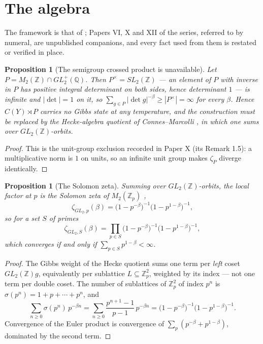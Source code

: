 \documentclass[11pt]{amsart}
\numberwithin{equation}{section}
\newtheorem{proposition}[theorem]{Proposition}
\theoremstyle{definition}
\theoremstyle{remark}
\newcommand{\Z}{\mathbb{Z}}
\newcommand{\Q}{\mathbb{Q}}
\begin{document}
\maketitle

\section{The algebra}

The framework is that of \cite{Main}; Papers VI, X and XII of the series, referred to by
numeral, are unpublished companions, and every fact used from them is restated or verified
in place.

\begin{proposition}[The semigroup crossed product is unavailable]\label{prop:units}
Let $P=M_2(\Z)\cap GL_2^+(\Q)$. Then $P^\times=SL_2(\Z)$ --- an element of $P$ with inverse
in $P$ has positive integral determinant on both sides, hence determinant $1$ --- is
infinite and $|\det|=1$ on it, so
$\sum_{g\in P}|\det g|^{-\beta}\ge|P^\times|=\infty$ for every $\beta$. Hence
$C(Y)\rtimes P$ carries no Gibbs state at any temperature, and the construction must be
replaced by the Hecke-algebra quotient of Connes--Marcolli \cite{CM}, in which one sums over
$GL_2(\Z)$-orbits.
\end{proposition}

\begin{proof}
This is the unit-group exclusion recorded in Paper X (its Remark 1.5): a multiplicative norm
is $1$ on units, so an infinite unit group makes
$\zeta_P$ diverge identically.
\end{proof}

\begin{proposition}[The Solomon zeta]\label{prop:solomon}
Summing over $GL_2(\Z)$-orbits, the local factor at $p$ is the Solomon zeta of $M_2(\Z_p)$
\cite{Solomon},
\[
\zeta_{GL_2,p}(\beta)=\bigl(1-p^{-\beta}\bigr)^{-1}\bigl(1-p^{1-\beta}\bigr)^{-1},
\]
so for a set $S$ of primes
\begin{equation}\label{eq:zetaGL2}
\zeta_{GL_2,S}(\beta)=\prod_{p\in S}\bigl(1-p^{-\beta}\bigr)^{-1}\bigl(1-p^{1-\beta}\bigr)^{-1},
\end{equation}
which converges if and only if $\sum_{p\in S}p^{1-\beta}<\infty$.
\end{proposition}

\begin{proof}
The Gibbs weight of the Hecke quotient sums one term per \emph{left} coset $GL_2(\Z)g$,
equivalently per sublattice $L\subseteq\Z_p^2$, weighted by its index \cite{CM} --- not one
term per double coset. The number of sublattices of $\Z_p^2$ of index $p^n$ is
$\sigma(p^n)=1+p+\cdots+p^n$, and
\[
\sum_{n\ge0}\sigma(p^n)\,p^{-\beta n}
=\sum_{n\ge0}\frac{p^{n+1}-1}{p-1}\,p^{-\beta n}
=\bigl(1-p^{-\beta}\bigr)^{-1}\bigl(1-p^{1-\beta}\bigr)^{-1}.
\]
Convergence of the Euler product
is convergence of $\sum_p(p^{-\beta}+p^{1-\beta})$, dominated by the second term.
\end{proof}
\end{document}
